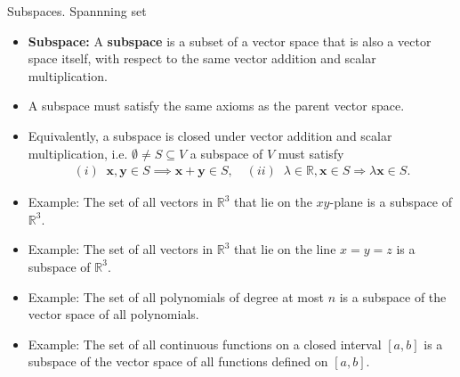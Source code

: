\begin{frame}{Subspaces. Spannning set }
\begin{itemize}
    \item \textbf{Subspace:} A \textbf{subspace} is a subset of a vector space that is also a vector space itself, with respect to the same  vector addition and scalar multiplication.
    \item A subspace must satisfy the same axioms as the parent vector space.
    \item Equivalently, a subspace is closed under vector addition and scalar multiplication, i.e. $\emptyset \neq S\subseteq V$ a subspace of $V$  must satisfy
    \begin{align*}
        (i)\;\; \mathbf{x}, \mathbf{y} \in S \implies \mathbf{x} + \mathbf{y} \in S, \quad (ii)\;\; \lambda\in \mathbb{R}, \mathbf{x} \in S \Longrightarrow \lambda \mathbf{x} \in S.
    \end{align*} 
\end{itemize}
\end{frame}
\begin{frame}
\begin{itemize}
    \item  Example: The set of all vectors in $\mathbb{R}^3$ that lie on the $xy$-plane is a subspace of $\mathbb{R}^3$.
    \item  Example: The set of all vectors in $\mathbb{R}^3$ that lie on the line $x = y = z$ is a subspace of $\mathbb{R}^3$.
    \item  Example: The set of all polynomials of degree at most $n$ is a subspace of the vector space of all polynomials.
    \item  Example: The set of all continuous functions on a closed interval $[a, b]$ is a subspace of the vector space of all functions defined on $[a, b]$.
\end{itemize}
\end{frame}

